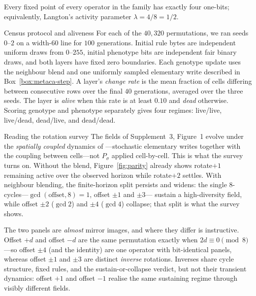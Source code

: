 \documentclass[man,12pt,floatsintext,donotrepeattitle]{apa7}
\newcommand{\sig}{\sigma}
\newcommand{\secref}[1]{\emph{\nameref{#1}}}
\begin{document}
\begin{theorem}[label={thm:lambda}]
Every fixed point of every operator in the family has exactly four one-bits;
equivalently, Langton's activity parameter $\lambda = 4/8 = 1/2$.
\end{theorem}

\begin{definition}[label={def:aliveness}]{Census protocol and aliveness}
For each of the $40{,}320$ permutations, we ran seeds $0$--$2$ on a width-$60$
line for $100$ generations. Initial rule bytes are independent uniform draws
from $0$--$255$, initial phenotype bits are independent fair binary draws, and
both layers have fixed zero boundaries. Each genotype update uses the
neighbour blend and one uniformly sampled elementary write described in
Box~\ref{box:metaca-step}. A layer's \emph{change rate} is the mean fraction of
cells differing between consecutive rows over the final $40$ generations,
averaged over the three seeds. The layer is \emph{alive} when this rate is at
least $0.10$ and \emph{dead} otherwise. Scoring genotype and phenotype
separately gives four regimes: live/live, live/dead, dead/live, and dead/dead.
\end{definition}

\begin{workedexample}[label={box:survey},breakable=false]{Reading the rotation survey}
\small
The fields of Supplement~3, Figure~1 evolve under the \emph{spatially coupled}
dynamics of \secref{sec:interrupter}---stochastic elementary writes together
with the coupling between cells---not $P_\sig$ applied cell-by-cell. This is
what the survey turns on. Without the blend, Figure~\ref{fig:parity} already
shows rotate$+1$ remaining active over the observed horizon while rotate$+2$
settles. With neighbour blending, the finite-horizon split persists and widens:
the single 8-cycles---$\gcd(\text{offset},8)=1$, offset $\pm 1$ and $\pm 3$---
sustain a high-diversity field, while offset $\pm 2$ ($\gcd 2$) and $\pm 4$
($\gcd 4$) collapse; that split is what the survey shows.

The two panels are \emph{almost} mirror images, and where they differ is
instructive. Offset $+d$ and offset $-d$ are the same permutation exactly when
$2d \equiv 0 \pmod 8$---so offset $\pm 4$ (and the identity) are one operator with
bit-identical panels, whereas offset $\pm 1$ and $\pm 3$ are distinct
\emph{inverse} rotations. Inverses share cycle structure, fixed rules, and the
sustain-or-collapse verdict, but not their transient dynamics: offset $+1$ and
offset $-1$ realise the same sustaining regime through visibly different fields.
\end{workedexample}
\end{document}
